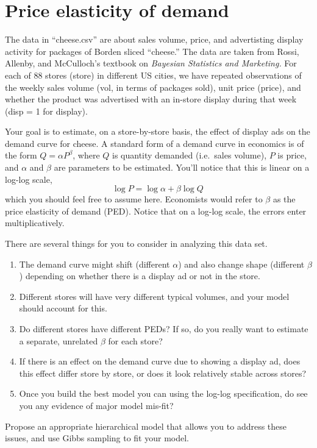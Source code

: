 \documentclass[10pt]{article}
\begin{document}
    \section*{Price elasticity of demand}

    The data in ``cheese.csv'' are about sales volume, price, and advertisting display activity for packages of Borden sliced ``cheese.'' The data are taken from Rossi, Allenby, and McCulloch's textbook on \textit{Bayesian Statistics and Marketing.} For each of 88 stores (store) in different US cities, we have repeated observations of the weekly sales volume (vol, in terms of packages sold), unit price (price), and whether the product was advertised with an in-store display during that week (disp = 1 for display).

    Your goal is to estimate, on a store-by-store basis, the effect of display ads on the demand curve for cheese.  A standard form of a demand curve in economics is of the form $Q = \alpha P^\beta$, where $Q$ is quantity demanded (i.e.~sales volume), $P$ is price, and $\alpha$ and $\beta$ are parameters to be estimated.  You'll notice that this is linear on a log-log scale,
    $$
    \log P = \log \alpha + \beta \log Q \,
    $$
    which you should feel free to assume here.  Economists would refer to $\beta$ as the price elasticity of demand (PED).  Notice that on a log-log scale, the errors enter multiplicatively.

    There are several things for you to consider in analyzing this data set.

    \begin{enumerate}
        \item The demand curve might shift (different $\alpha$) and also change shape (different $\beta$) depending on whether there is a display ad or not in the store.
        \item Different stores will have very different typical volumes, and your model should account for this.
        \item Do different stores have different PEDs?  If so, do you really want to estimate a separate, unrelated $\beta$ for each store?
        \item If there is an effect on the demand curve due to showing a display ad, does this effect differ store by store, or does it look relatively stable across stores?
        \item Once you build the best model you can using the log-log specification, do see you any evidence of major model mis-fit?
    \end{enumerate}

    Propose an appropriate hierarchical model that allows you to address these issues, and use Gibbs sampling to fit your model.
\end{document}
